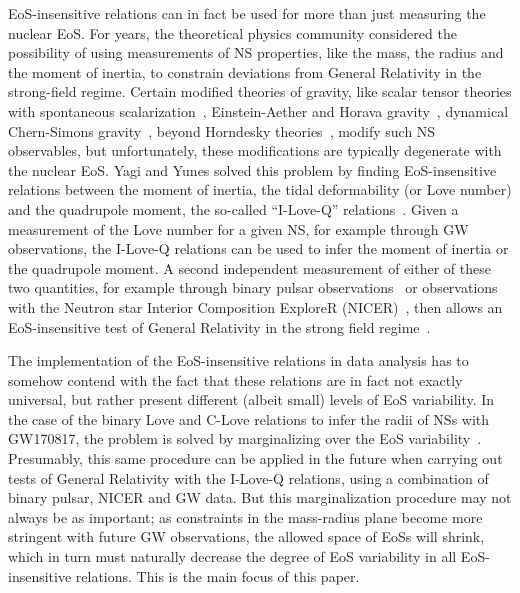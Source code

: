 \documentclass[prd,twocolumn,nofootinbib,superscriptaddress,amsmath,amssymb]{revtex4-1}
\begin{document}
EoS-insensitive relations can in fact be used for more than just measuring the nuclear EoS. For years, the theoretical physics community considered the possibility of using measurements of NS properties, like the mass, the radius and the moment of inertia, to constrain deviations from General Relativity in the strong-field regime. Certain modified theories of gravity, like scalar tensor theories with spontaneous scalarization~\cite{Damour:1996ke}, Einstein-Aether and Horava gravity~\cite{Eling:2007xh,Yagi:2013ava,Yagi:2013qpa}, dynamical Chern-Simons gravity~\cite{Yunes:2009ch}, beyond Horndesky theories~\cite{Sakstein:2016oel}, modify such NS observables, but unfortunately, these modifications are typically degenerate with the nuclear EoS. Yagi and Yunes solved this problem by finding EoS-insensitive relations between the moment of inertia, the tidal deformability (or Love number) and the quadrupole moment, the so-called ``I-Love-Q'' relations~\cite{Yagi:ILQ}. Given a measurement of the Love number for a given NS, for example through GW observations, the I-Love-Q relations can be used to infer the moment of inertia or the quadrupole moment. A second independent measurement of either of these two quantities, for example through binary pulsar observations~\cite{Lattimer:2004nj} or observations with the Neutron star Interior Composition ExploreR (NICER)~\cite{Ozel:2015ykl}, then allows an EoS-insensitive test of General Relativity in the strong field regime~\cite{Yagi:ILQ}. 

The implementation of the EoS-insensitive relations in data analysis has to somehow contend with the fact that these relations are in fact not exactly universal, but rather present different (albeit small) levels of EoS variability. In the case of the binary Love and C-Love relations to infer the radii of NSs with GW170817, the problem is solved by marginalizing over the EoS variability~\cite{Katerina:residuals}. Presumably, this same procedure can be applied in the future when carrying out tests of General Relativity with the I-Love-Q relations, using a combination of binary pulsar, NICER and GW data. But this marginalization procedure may not always be as important; as constraints in the mass-radius plane become more stringent with future GW observations, the allowed space of EoSs will shrink, which in turn must naturally decrease the degree of EoS variability in all EoS-insensitive relations. This is the main focus of this paper.  


\end{document}
